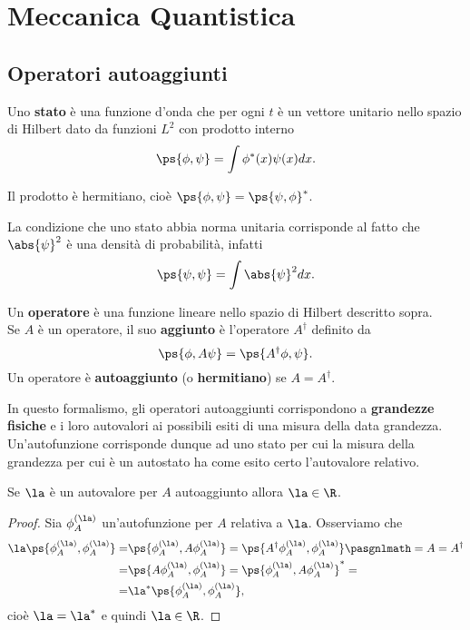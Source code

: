 \chapter{Meccanica Quantistica}

\section{Operatori autoaggiunti}
\begin{definition}[Stato]
Uno \textbf{stato} \`e una funzione d'onda che per ogni $t$ \`e un vettore unitario nello spazio di Hilbert dato da funzioni $L^2$ con prodotto interno
\[\ps{\phi,\psi}=\int\phi^\ast(x)\psi(x)dx.\]
\end{definition}
\begin{remark}
Il prodotto \`e hermitiano, cio\`e $\ps{\phi,\psi}=\ps{\psi,\phi}^\ast$.
\end{remark}
\begin{remark}
La condizione che uno stato abbia norma unitaria corrisponde al fatto che $\abs{\psi}^2$ \`e una densit\`a di probabilit\`a, infatti
\[\ps{\psi,\psi}=\int \abs{\psi}^2dx.\]
\end{remark}

\begin{definition}
Un \textbf{operatore} \`e una funzione lineare nello spazio di Hilbert descritto sopra.\\
Se $A$ \`e un operatore, il suo \textbf{aggiunto} \`e l'operatore $A^\dag$ definito da
\[\ps{\phi,A\psi}=\ps{A^\dag\phi,\psi}.\]
Un operatore \`e \textbf{autoaggiunto} (o \textbf{hermitiano}) se $A=A^\dag$.
\end{definition}

\noindent In questo formalismo, gli operatori autoaggiunti corrispondono a \textbf{grandezze fisiche} e i loro autovalori ai possibili esiti di una misura della data grandezza.\\
Un'autofunzione corrisponde dunque ad uno stato per cui la misura della grandezza per cui \`e un autostato ha come esito certo l'autovalore relativo.

\begin{proposition}
Se $\la$ \`e un autovalore per $A$ autoaggiunto allora $\la\in \R$.
\end{proposition}
\begin{proof}
Sia $\phi_A^{(\la)}$ un'autofunzione per $A$ relativa a $\la$. Osserviamo che
\begin{align*}
\la\ps{\phi_A^{(\la)},\phi^{(\la)}_A}=&\ps{\phi_A^{(\la)},A\phi_A^{(\la)}}=\ps{A^\dag \phi_A^{(\la)},\phi_A^{(\la)}}\pasgnlmath={A=A^\dag}\\
=&\ps{A\phi_A^{(\la)},\phi_A^{(\la)}}=\ps{\phi_A^{(\la)},A\phi_A^{(\la)}}^\ast=\\
=&\la^\ast\ps{\phi_A^{(\la)},\phi_A^{(\la)}},
\end{align*}
cio\`e $\la=\la^\ast$ e quindi $\la\in\R$.
\end{proof}



